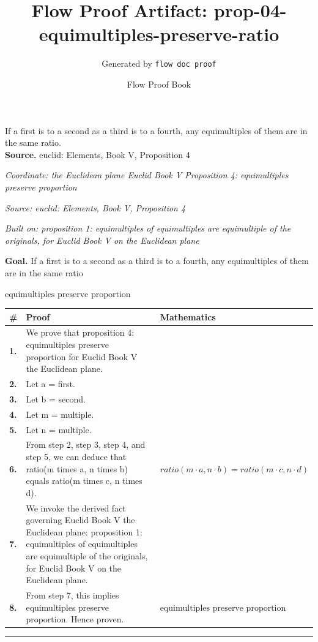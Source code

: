 \documentclass[11pt]{article}
\title{Flow Proof Artifact: prop-04-equimultiples-preserve-ratio}
\author{Generated by \texttt{flow doc proof}}
\date{Flow Proof Book}
\theoremstyle{definition}
\begin{document}
\maketitle
If a first is to a second as a third is to a fourth, any equimultiples of them are in the same ratio.\\[0.5em]
\textbf{Source.} euclid: Elements, Book V, Proposition 4\\[0.5em]
\bigskip
{}\par
\smallskip\noindent\textit{Coordinate: the Euclidean plane \cdot Euclid Book V \cdot Proposition 4: equimultiples preserve proportion}\par
\smallskip\noindent\textit{Source: euclid: Elements, Book V, Proposition 4}\par
\smallskip\noindent\textit{Built on: proposition 1: equimultiples of equimultiples are equimultiple of the originals, for Euclid Book V on the Euclidean plane}\par
\medskip
\noindent\textbf{Goal.} If a first is to a second as a third is to a fourth, any equimultiples of them are in the same ratio\par
\noindent$\displaystyle \text{equimultiples preserve proportion}$\par
\medskip
\noindent
\begin{tabular}{@{} >{\raggedright\arraybackslash}p{} >{\raggedright\arraybackslash}p{} >{\raggedleft\arraybackslash}p{} @{}}
\textbf{\#} & \textbf{Proof} & \textbf{Mathematics} \\
\midrule
\textbf{1.} & We prove that proposition 4: equimultiples preserve proportion for Euclid Book V the Euclidean plane. & \\[0.45em]
\textbf{2.} & Let a = first. & \\[0.45em]
\textbf{3.} & Let b = second. & \\[0.45em]
\textbf{4.} & Let m = multiple. & \\[0.45em]
\textbf{5.} & Let n = multiple. & \\[0.45em]
\textbf{6.} & From step 2, step 3, step 4, and step 5, we can deduce that ratio(m times a, n times b) equals ratio(m times c, n times d). & $\displaystyle ratio(m \cdot a, n \cdot b) = ratio(m \cdot c, n \cdot d)$ \\[0.45em]
\textbf{7.} & We invoke the derived fact governing Euclid Book V the Euclidean plane: proposition 1: equimultiples of equimultiples are equimultiple of the originals, for Euclid Book V on the Euclidean plane. & \\[0.45em]
\textbf{8.} & From step 7, this implies equimultiples preserve proportion. Hence proven. & $\displaystyle \text{equimultiples preserve proportion}$ \\[0.45em]
\bottomrule
\end{tabular}
\label{thm:Geometry-Euclid Book V-proposition_4_equimultiples_preserve_proportion}
\par\medskip\hrule
\end{document}
